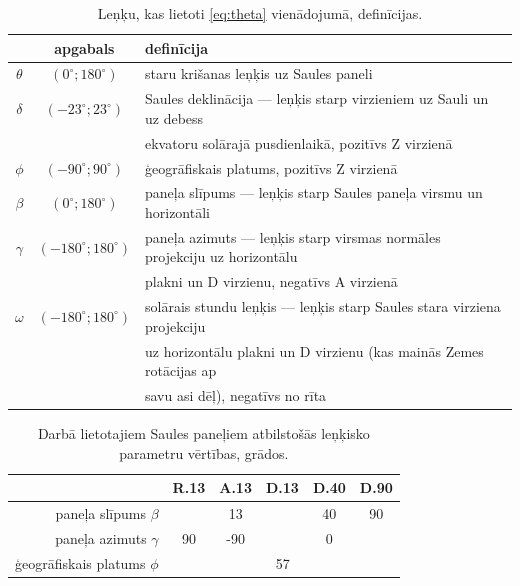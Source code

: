 \begin{table}[h!]
	\caption{Leņķu, kas lietoti \ref{eq:theta} vienādojumā, definīcijas.}
	\begin{center}
		\begin{tabular}{|c|c|l|}
			\hline
			         &         apgabals         & definīcija                                                                 \\ \hline\hline
			$\theta$ &  $(0^\circ;180^\circ)$   & staru krišanas leņķis uz Saules paneli                                     \\ \hline
			$\delta$ &  $(-23^\circ;23^\circ)$  & Saules deklinācija --- leņķis starp virzieniem uz Sauli un uz debess       \\
			         &                          & ekvatoru solārajā pusdienlaikā, pozitīvs Z virzienā                        \\ \hline
			 $\phi$  &  $(-90^\circ;90^\circ)$  & ģeogrāfiskais platums, pozitīvs Z virzienā                                 \\ \hline
			$\beta$  &  $(0^\circ;180^\circ)$   & paneļa slīpums --- leņķis starp Saules paneļa virsmu un horizontāli        \\ \hline
			$\gamma$ & $(-180^\circ;180^\circ)$ & paneļa azimuts --- leņķis starp virsmas normāles projekciju uz horizontālu \\
			         &                          & plakni un D virzienu, negatīvs A virzienā                                  \\ \hline
			$\omega$ & $(-180^\circ;180^\circ)$ & solārais stundu leņķis --- leņķis starp Saules stara virziena projekciju   \\
			         &                          & uz horizontālu plakni un D virzienu (kas mainās Zemes rotācijas ap         \\
			         &                          & savu asi dēļ), negatīvs no rīta                                            \\ \hline
		\end{tabular}
	\end{center}
	\label{tab:theta}
\end{table}

\begin{table}[h!]
	\caption{Darbā lietotajiem Saules paneļiem atbilstošās leņķisko parametru vērtības, grādos.}
	\begin{center}
		\begin{tabular}{|r|c|c|c|c|c|}
			\hline
			         & R.13 & A.13 &   D.13   & D.40 & D.90 \\ \hline\hline
			paneļa slīpums $\beta$  & \multicolumn{3}{c|}{13} &  40  &  90  \\ \hline
			paneļa azimuts $\gamma$ &  90  & -90  & \multicolumn{3}{c|}{0}  \\ \hline
			ģeogrāfiskais platums $\phi$  &        \multicolumn{5}{c|}{57}        \\ \hline
		\end{tabular}
	\end{center}
	\label{tab:param}
\end{table}

